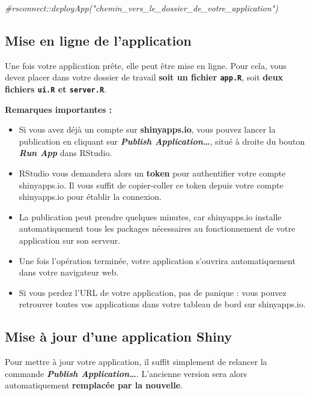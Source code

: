 \documentclass[
]{article}
\newenvironment{Shaded}{\begin{snugshade}}{\end{snugshade}}
\newcommand{\CommentTok}[1]{\textcolor[rgb]{0.56,0.35,0.01}{\textit{#1}}}
\begin{document}
\begin{Shaded}
\begin{Highlighting}[]
\CommentTok{\#rsconnect::deployApp("chemin\_vers\_le\_dossier\_de\_votre\_application")}
\end{Highlighting}
\end{Shaded}

\subsection{Mise en ligne de
l'application}\label{mise-en-ligne-de-lapplication}

Une fois votre application prête, elle peut être mise en ligne. Pour
cela, vous devez placer dans votre dossier de travail \textbf{soit un
fichier \texttt{app.R}}, soit \textbf{deux fichiers \texttt{ui.R} et
\texttt{server.R}}.

\textbf{Remarques importantes :}

\begin{itemize}
\item
  Si vous avez déjà un compte sur \textbf{shinyapps.io}, vous pouvez
  lancer la publication en cliquant sur \textbf{\emph{Publish
  Application\ldots{}}}, situé à droite du bouton \textbf{\emph{Run
  App}} dans RStudio.
\item
  RStudio vous demandera alors un \textbf{token} pour authentifier votre
  compte shinyapps.io. Il vous suffit de copier-coller ce token depuis
  votre compte shinyapps.io pour établir la connexion.
\item
  La publication peut prendre quelques minutes, car shinyapps.io
  installe automatiquement tous les packages nécessaires au
  fonctionnement de votre application sur son serveur.
\item
  Une fois l'opération terminée, votre application s'ouvrira
  automatiquement dans votre navigateur web.
\item
  Si vous perdez l'URL de votre application, pas de panique : vous
  pouvez retrouver toutes vos applications dans votre tableau de bord
  sur shinyapps.io.
\end{itemize}

\subsection{Mise à jour d'une application
Shiny}\label{mise-uxe0-jour-dune-application-shiny}

Pour mettre à jour votre application, il suffit simplement de relancer
la commande \textbf{\emph{Publish Application\ldots{}}}. L'ancienne
version sera alors automatiquement \textbf{remplacée par la nouvelle}.
\end{document}
